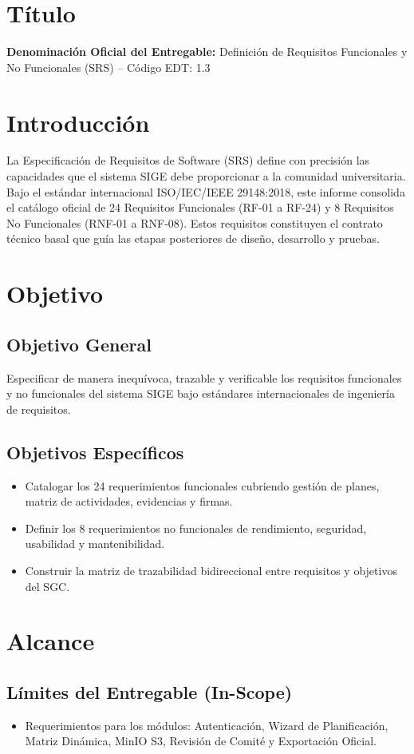 \documentclass[12pt,a4paper]{article}
\begin{document}
\section{Título}
\textbf{Denominación Oficial del Entregable:} Definición de Requisitos Funcionales y No Funcionales (SRS) -- Código EDT: 1.3

\section{Introducción}
La Especificación de Requisitos de Software (SRS) define con precisión las capacidades que el sistema SIGE debe proporcionar a la comunidad universitaria. Bajo el estándar internacional ISO/IEC/IEEE 29148:2018, este informe consolida el catálogo oficial de 24 Requisitos Funcionales (RF-01 a RF-24) y 8 Requisitos No Funcionales (RNF-01 a RNF-08). Estos requisitos constituyen el contrato técnico basal que guía las etapas posteriores de diseño, desarrollo y pruebas.

\section{Objetivo}
\subsection{Objetivo General}
Especificar de manera inequívoca, trazable y verificable los requisitos funcionales y no funcionales del sistema SIGE bajo estándares internacionales de ingeniería de requisitos.
\subsection{Objetivos Específicos}
\begin{itemize}[leftmargin=1.5em, itemsep=2pt]
    \item Catalogar los 24 requerimientos funcionales cubriendo gestión de planes, matriz de actividades, evidencias y firmas.
    \item Definir los 8 requerimientos no funcionales de rendimiento, seguridad, usabilidad y mantenibilidad.
    \item Construir la matriz de trazabilidad bidireccional entre requisitos y objetivos del SGC.
\end{itemize}

\section{Alcance}
\subsection{Límites del Entregable (In-Scope)}
\begin{itemize}[leftmargin=1.5em, itemsep=2pt]
    \item Requerimientos para los módulos: Autenticación, Wizard de Planificación, Matriz Dinámica, MinIO S3, Revisión de Comité y Exportación Oficial.
\end{itemize}
\end{document}
